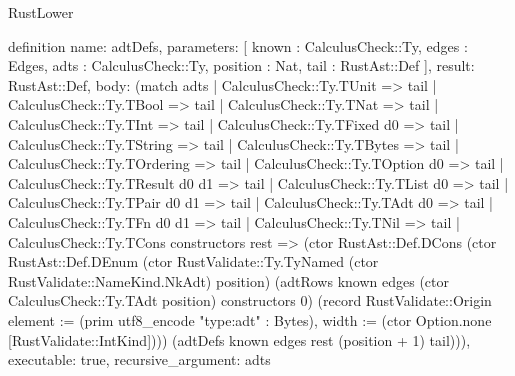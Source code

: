 \begin{lexlean}{RustLower}
\begin{semanticmodule}
definition{
  name: adtDefs,
  parameters: [
    known : CalculusCheck::Ty,
    edges : Edges,
    adts : CalculusCheck::Ty,
    position : Nat,
    tail : RustAst::Def
  ],
  result: RustAst::Def,
  body: (match adts
    | CalculusCheck::Ty.TUnit => tail
    | CalculusCheck::Ty.TBool => tail
    | CalculusCheck::Ty.TNat => tail
    | CalculusCheck::Ty.TInt => tail
    | CalculusCheck::Ty.TFixed d0 => tail
    | CalculusCheck::Ty.TString => tail
    | CalculusCheck::Ty.TBytes => tail
    | CalculusCheck::Ty.TOrdering => tail
    | CalculusCheck::Ty.TOption d0 => tail
    | CalculusCheck::Ty.TResult d0 d1 => tail
    | CalculusCheck::Ty.TList d0 => tail
    | CalculusCheck::Ty.TPair d0 d1 => tail
    | CalculusCheck::Ty.TAdt d0 => tail
    | CalculusCheck::Ty.TFn d0 d1 => tail
    | CalculusCheck::Ty.TNil => tail
    | CalculusCheck::Ty.TCons constructors rest => (ctor RustAst::Def.DCons (ctor RustAst::Def.DEnum (ctor RustValidate::Ty.TyNamed (ctor RustValidate::NameKind.NkAdt) position) (adtRows known edges (ctor CalculusCheck::Ty.TAdt position) constructors 0) (record RustValidate::Origin {element := (prim utf8_encode "type:adt" : Bytes), width := (ctor Option.none [RustValidate::IntKind])})) (adtDefs known edges rest (position + 1) tail))),
  executable: true,
  recursive_argument: adts
}


\end{semanticmodule}
\end{lexlean}
